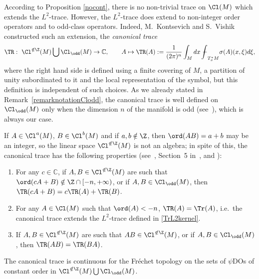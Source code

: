 According to Proposition \ref{nocont}, there is no non-trivial trace on $\Cl(M)$ which extends the $L^2$-trace. However, the $L^2$-trace does extend to non-integer order operators and to odd-class operators. Indeed, M.~Kontsevich and S.~Vishik~\cite{kontsevichdeterminant} constructed such an extension, the \emph{canonical trace}
\begin{gather*}
\TR: \ \Cl^{\notin\Z}(M)\bigcup\Cl_{\odd}(M) \to\mathbb{C},\qquad
 A  \mapsto\TR(A):=\dfrac{1}{(2\pi)^n}\int_Mdx\ {-\hskip -11,5pt\int}_{T_x^{*}M}\sigma(A)(x,\xi)d\xi,
\end{gather*}
where the right hand side is def\/ined using a f\/inite covering of $M$, a partition of unity subordinated to it and the local representation of the symbol, but this def\/inition is independent of such choices. As we already stated in Remark~\ref{remarknotationClodd}, the canonical trace is well def\/ined on $\Cl_{\odd}(M)$ only when the dimension $n$ of the manifold is odd (see~\cite{grubb,lesch}), which is always our case.

 If $A\in \Cl^{a}(M)$, $B\in \Cl^b(M)$ and if $a,b\notin\Z$, then $\ord(AB)=a+b$ may be an integer, so the linear space $\Cl^{\notin\Z}(M)$ is not an algebra; in spite of this, the canonical trace has the following properties (see~\cite{kontsevichdeterminant}, Section~5 in~\cite{lesch}, and \cite{ouedraogo,sylvie,scott}):
 \begin{enumerate}\itemsep=0pt
\item For any $c\in\mathbb{C}$, if $A,B\in\Cl^{\notin\Z}(M)$ are such that $\ord(c A+B)\notin\Z\cap[-n,+\infty)$, or if $A,B\in\Cl_{\odd}(M)$, then $\TR(c A+B)=c\TR(A)+\TR(B)$.
\item For any $A\in\Cl(M)$ such that $\ord(A)<-n$, $\TR(A)=\Tr(A)$, i.e.\ the canonical trace extends the $L^2$-trace def\/ined in \eqref{TrL2kernel}.
\item If $A,B\in\Cl^{\notin\Z}(M)$ are such that $AB\in\Cl^{\notin\Z}(M)$, or if $A,B\in\Cl_{\odd}(M)$, then $\TR(AB)=\TR(BA)$.
\end{enumerate}

The canonical trace is continuous for the Fr\'echet topology on the sets of $\psi$DOs of constant order in $\Cl^{\notin\Z}(M)\bigcup\Cl_{\odd}(M)$.

